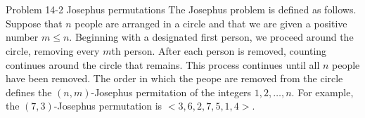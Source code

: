 \documentclass[paper=a4, fontsize=11pt]{scrartcl} %
\begin{document}
\section{}

\begin{fancyquotes}
  Problem 14-2 Josephus permutations The Josephus problem is defined
  as follows. Suppose that $n$ people are arranged in a circle and
  that we are given a positive number $m\leq n$. Beginning with a
  designated first person, we proceed around the circle, removing
  every $m$th person. After each person is removed, counting continues
  around the circle that remains. This process continues until all $n$
  people have been removed. The order in which the peope are removed
  from the circle defines the $(n,m)$-Josephus permitation of the
  integers $1,2,\ldots,n$. For example, the $(7,3)$-Josephus
  permutation is $<3,6,2,7,5,1,4>$.
\end{fancyquotes}
\end{document}
